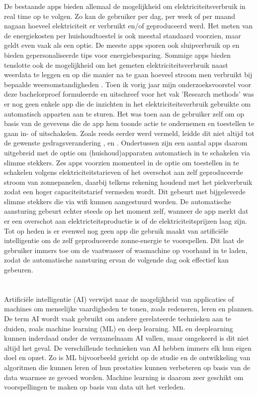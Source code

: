 De bestaande apps bieden allemaal de mogelijkheid om elektriciteitsverbruik in real time op te volgen. Zo kan de gebruiker per dag, per week of per maand nagaan hoeveel elektriciteit er verbruikt en/of geproduceerd werd. Het meten van de energiekosten per huishoudtoestel is ook meestal standaard voorzien, maar geldt even vaak als een optie. De meeste apps sporen ook sluipverbruik op en bieden gepersonaliseerde tips voor energiebesparing. Sommige apps bieden tenslotte ook de mogelijkheid om het gemeten elektriciteitsverbruik naast weerdata te leggen en op die manier na te gaan hoeveel stroom men verbruikt bij bepaalde weersomstandigheden \autocite{Deman2021}. Toen ik vorig jaar mijn onderzoeksvoorstel voor deze bachelorproef formuleerde en uitschreef voor het vak 'Research methods' was er nog geen enkele app die de inzichten in het elektriciteitsverbruik gebruikte om automatisch apparten aan te sturen. Het was toen aan de gebruiker zelf om op basis van de gevevens die de app hem toonde actie te ondernemen en toestellen te gaan in- of uitschakelen. Zoals reeds eerder werd vermeld, leidde dit niet altijd tot de gewenste gedragsverandering \autocite{Wemyss2019}, \autocite{Mack2019} en  \autocite{VREG2021}. Ondertussen zijn een aantal apps daarom uitgebreid met de optie om (huishoud)apparaten automatisch in te schakelen via slimme stekkers. Zes apps voorzien momenteel in de optie om toestellen in te schakelen volgens elektriciteitstarieven of het overschot aan zelf geproduceerde stroom van zonnepanelen, daarbij telkens rekening houdend met het piekverbruik zodat een hoger capaciteitstarief vermeden wordt. Dit gebeurt met bijgeleverde slimme stekkers die via wifi kunnen aangestuurd worden. De automatische aansturing gebeurt echter steeds op het moment zelf, wanneer de app merkt dat er een overschot aan elektricteitsproductie is of de elektriciteitsprijzen laag zijn. Tot op heden is er evenwel nog geen app die gebruik maakt van artificiële intelligentie om de zelf geproduceerde zonne-energie te voorspellen. Dit laat de gebruiker immers toe om de vaatwasser of wasmachine op voorhand  in te laden, zodat de automatische aansturing ervan de volgende dag ook effectief kan gebeuren. 

\section{}%
\label{sec:voorspellingen maken met AI}

Artificiële intelligentie (AI) verwijst naar de mogelijkheid van applicaties of machines om menselijke vaardigheden te tonen, zoals redeneren, leren en plannen. De term AI wordt vaak gebruikt om andere gerelateerde technieken aan te duiden, zoals machine learning (ML) en deep learning. ML en deeplearning kunnen inderdaad onder de verzamelnaam AI vallen, maar omgekeerd is dit niet altijd het geval. De verschillende technieken van AI hebben immers elk hun eigen doel en opzet. Zo is ML bijvoorbeeld gericht op de studie en de ontwikkeling van algoritmen die kunnen leren of hun prestaties kunnen verbeteren op basis van de data waarmee ze gevoed worden. Machine learning is daarom zeer geschikt om voorspellingen te maken op basis van data uit het verleden. 

